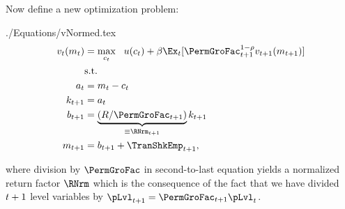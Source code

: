 \documentclass[SolvingMicroDSOPs]{subfiles}
\begin{document}
Now define a new optimization problem:
\begin{verbatimwrite}{./Equations/vNormed.tex}
  \begin{equation}\begin{gathered}\begin{aligned}
        \vFunc_{\prd}(\mNrm_{\prd}) & = \max_{{\cNrm}_{\prd}} ~~ \uFunc(\cNrm_{\prd})+{\DiscFac}\Ex_{\prd}[ \PermGroFac_{\prd+1}^{1-\CRRA}\vFunc_{\prd+1}(\mNrm_{\prd+1})] \label{eq:vNormed}                   \\
                                         & \text{s.t.}                                                                                 \\
        \aNrm_{\prd}                       & = \mNrm_{\prd}-\cNrm_{\prd}                                                                     \\
        \kNrm_{\prd+1}                     & = \aNrm_{\prd}                                                                                \\
        \bNrm_{\prd+1}                     & = \underbrace{\left(\Rfree/\PermGroFac_{\prd+1}\right)}_{\equiv \RNrm_{\prd+1}}\kNrm_{\prd+1} \\
        \mNrm_{t+1}                        & = \bNrm_{t+1}+\TranShkEmp_{t+1},
      \end{aligned}\end{gathered}\end{equation}
\end{verbatimwrite}
\unskip
where division by $\PermGroFac$ in second-to-last equation yields a normalized return factor $\RNrm$ which is the consequence of the fact that we have divided $t+1$ level variables by $\pLvl_{\prd+1}=\PermGroFac_{\prd+1}\pLvl_{\prd}$.
\end{document}
